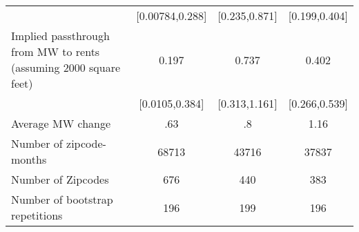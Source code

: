 {\begin{tabular}{l*{3}{c}}
            &       [0.00784,0.288]         &         [0.235,0.871]         &         [0.199,0.404]         \\
[1em]
Implied passthrough from MW to rents (assuming 2000 square feet)&                 0.197\sym{*}  &                 0.737\sym{***}&                 0.402\sym{***}\\
            &        [0.0105,0.384]         &         [0.313,1.161]         &         [0.266,0.539]         \\
\hline
Average MW change&                   .63         &                    .8         &                  1.16         \\
Number of zipcode-months&                 68713         &                 43716         &                 37837         \\
Number of Zipcodes&                   676         &                   440         &                   383         \\
Number of bootstrap repetitions&                   196         &                   199         &                   196         \\
\hline\hline
\end{tabular}
}
